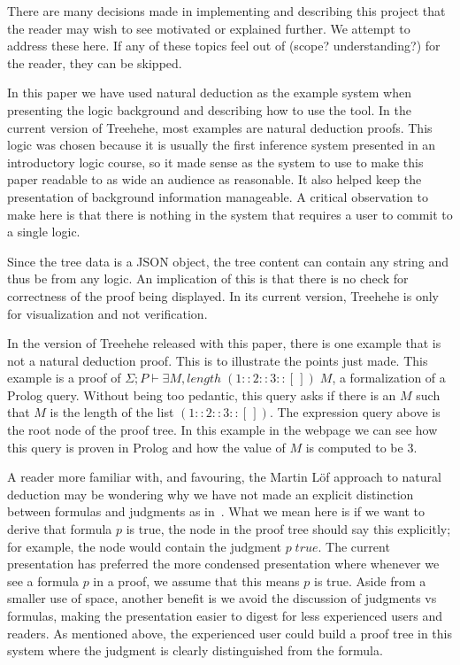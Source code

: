 \documentclass[conference]{IEEEtran}
\newcommand{\projectname}{Treehehe}
\begin{document}
There are many decisions made in implementing and describing this project that the reader may wish to see motivated or explained further. We attempt to address these here. If any of these topics feel out of (scope? understanding?) for the reader, they can be skipped.

In this paper we have used natural deduction as the example system when presenting the logic background and describing how to use the tool. In the current version of \projectname{}, most examples are natural deduction proofs. This logic was chosen because it is usually the first inference system presented in an introductory logic course, so it made sense as the system to use to make this paper readable to as wide an audience as reasonable. It also helped keep the presentation of background information manageable. A critical observation to make here is that there is nothing in the system that requires a user to commit to a single logic.

Since the tree data is a JSON object, the tree content can contain any string and thus be from any logic. An implication of this is that there is no check for correctness of the proof being displayed. In its current version, \projectname{} is only for visualization and not verification.

In the version of \projectname{} released with this paper, there is one example that is not a natural deduction proof. This is to illustrate the points just made. This example is a proof of $\Sigma ; P \vdash \exists M, \mathit{length} \; (1 :: 2 :: 3 :: [ \, ]) \; M$, a formalization of a Prolog query. Without being too pedantic, this query asks if there is an $M$ such that $M$ is the length of the list $(1 :: 2 :: 3 :: [\, ])$. The expression query above is the root node of the proof tree. In this example in the webpage we can see how this query is proven in Prolog and how the value of $M$ is computed to be 3.

A reader more familiar with, and favouring, the Martin L{\"o}f approach to natural deduction may be wondering why we have not made an explicit distinction between formulas and judgments as in~\cite{natded-pfenning}. What we mean here is if we want to derive that formula $p$ is true, the node in the proof tree should say this explicitly; for example, the node would contain the judgment $p \; \mathit{true}$. The current presentation has preferred the more condensed presentation where whenever we see a formula $p$ in a proof, we assume that this means $p$ is true. Aside from a smaller use of space, another benefit is we avoid the discussion of judgments vs formulas, making the presentation easier to digest for less experienced users and readers. As mentioned above, the experienced user could build a proof tree in this system where the judgment is clearly distinguished from the formula.
\end{document}
